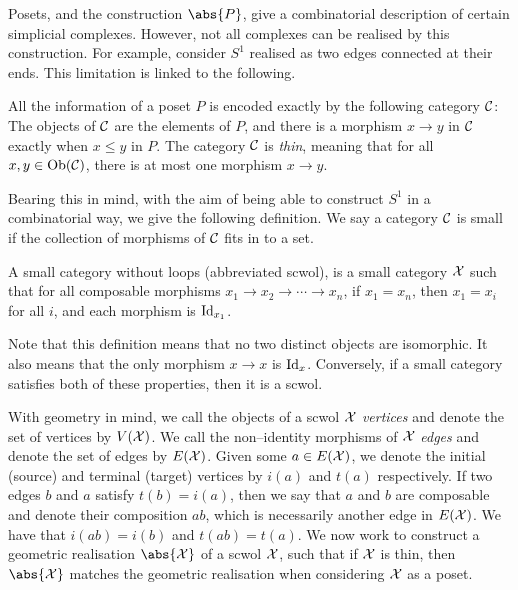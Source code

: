 Posets, and the construction $\abs{P}$, give a combinatorial description of certain simplicial complexes.
However, not all complexes can be realised by this construction.
For example, consider $S^1$ realised as two edges connected at their ends.
This limitation is linked to the following.

\begin{observation}
	All the information of a poset $P$ is encoded exactly by the following category $\mathcal{C}$:
	The objects of  $\mathcal{C}$ are the elements of  $P$, and there is a morphism  $x \to y$ in  $\mathcal{C}$ exactly when  $x \leq y$ in $P$.
	The category $\mathcal{C}$ is \emph{thin}, meaning that for all  $x,y \in \operatorname{Ob}(\mathcal{C})$, there is at most one morphism  $x \to y$.
\end{observation}
Bearing this in mind, with the aim of being able to construct $S^1$ in a combinatorial way, we give the following definition.
We say a category $\mathcal{C}$ is small if the collection of morphisms of $\mathcal{C}$ fits in to a set.

\begin{definition}
	A small category without loops (abbreviated scwol), is a small category $\mathcal{X}$ such that for all composable morphisms $x_1 \to x_2 \to \cdots \to x_n$, if $x_1=x_n$, then $x_1=x_i$ for all $i$, and each morphism is $\operatorname{Id}_{x_1}$.
	\label{def:scwol}
\end{definition}

Note that this definition means that no two distinct objects are isomorphic.
It also means that the only morphism $x \to x$ is $\operatorname{Id}_x$.
Conversely, if a small category satisfies both of these properties, then it is a scwol.

With geometry in mind, we call the objects of a scwol $\mathcal{X}$ \emph{vertices} and denote the set of vertices by $V(\mathcal{X})$.
We call the non--identity morphisms of  $\mathcal{X}$ \emph{edges} and denote the set of edges by $E(\mathcal{X})$.
Given some $a \in E(\mathcal{X})$, we denote the initial (source) and terminal (target) vertices by $i(a)$ and $t(a)$ respectively.
If two edges $b$ and $a$ satisfy $t(b)=i(a)$, then we say that $a$ and $b$ are composable and denote their composition $ab$, which is necessarily another edge in $E(\mathcal{X})$.
We have that $i(ab) = i(b)$ and $t(ab) = t(a)$.
We now work to construct a geometric realisation $\abs{\calx}$ of a scwol $\mathcal{X}$, such that if $\mathcal{X}$ is thin, then $\abs{\calx}$ matches the geometric realisation when considering $\mathcal{X}$ as a poset.

